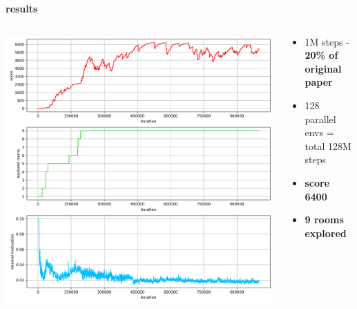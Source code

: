 \documentclass[xcolor=dvipsnames]{beamer}
\begin{document}
\begin{frame}{\bf results}


\begin{columns}

    \begin{column}{0.5\textwidth}
      \includegraphics[scale=0.25]{../results/montezuma_ppo_rnd_a.png}
    \end{column}

    \begin{column}{0.5\textwidth}
      \begin{itemize}
        \item 1M  steps - {\bf 20\% of original paper}
        \item 128 parallel envs = total 128M steps
        \item {\bf score 6400}
        \item {\bf 9 rooms explored}
      \end{itemize}
    \end{column}


\end{columns}


\end{frame}
\end{document}
